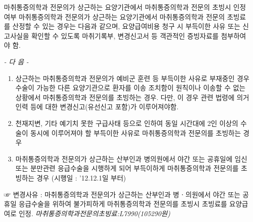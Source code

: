 \begin{commentbox}{마취통증의학과 전문의가 상근하는 요양기관에서 마취통증의학과 전문의 초빙시 인정여부}
마취통증의학과 전문의가 상근하는 요양기관에서 마취통증의학과 전문의 초빙료를 산정할 수 있는 경우는 다음과 같으며, 요양급여비용 청구 시 부득이한 사유 또는 신고사실을 확인할 수 있도록 마취기록부, 변경신고서 등 객관적인 증빙자료를 첨부하여야 함. 
\begin{center}\emph{- 다 음 -}\end{center}
\begin{enumerate}[가.]\tightlist
\item 상근하는 마취통증의학과 전문의가 예비군 훈련 등 부득이한 사유로 부재중인 경우 수술이 가능한 다른 요양기관으로 환자를 이송 조치함이 원칙이나 이송할 수 없는 상황에서 마취통증의학과 전문의를 초빙하는 경우. 다만, 이 경우 관련 법령에 의거 인력 등에 대한 변경신고(유선신고 포함)가 이루어져야함. 
\item  천재지변, 기타 예기치 못한 구급사태 등으로 인하여 동일 시간대에 2인 이상의 수술이 동시에 이루어져야 할 부득이한 사유로 마취통증의학과 전문의를 초빙하는 경우
\item 마취통증의학과 전문의가 상근하는 산부인과 병의원에서 야간 또는 공휴일에 임신 또는 분만관련 응급수술을 시행하게 되어 부득이하게 마취통증의학과 전문의를 초빙하는 경우\newline
(시행일 : '12.12.1일 부터)
\end{enumerate}  
☞ 변경사유 : 마취통증의학과 전문의가 상근하는 산부인과 병ㆍ의원에서 야간 또는 공휴일 응급수술을 위하여 불가피하게 마취통증의학과 전문의를 초빙시 초빙료를 요양급여로 인정. \emph{마취통증의학과전문의초빙료:L7990(105290원)}
\end{commentbox}

